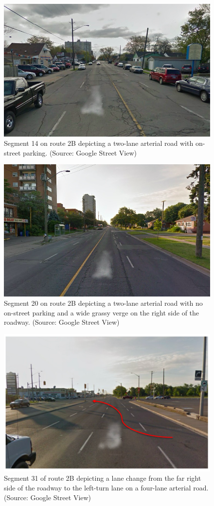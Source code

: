 \documentclass[]{elsarticle} %
\begin{document}
\begin{figure}

{\centering \includegraphics[width=0.65\linewidth]{Figure 19} 

}

\caption{Segment 14 on route 2B depicting a two-lane arterial road with on-street parking. (Source: Google Street View)}\label{fig:figure-20}
\end{figure}
\begin{figure}

{\centering \includegraphics[width=0.65\linewidth]{Figure 20} 

}

\caption{Segment 20 on route 2B depicting a two-lane arterial road with no on-street parking and a wide grassy verge on the right side of the roadway. (Source: Google Street View)}\label{fig:figure-21}
\end{figure}

\begin{figure}

{\centering \includegraphics[width=0.65\linewidth]{Figure 21} 

}

\caption{Segment 31 of route 2B depicting a lane change from the far right side of the roadway to the left-turn lane on a four-lane arterial road. (Source: Google Street View)}\label{fig:figure-22}
\end{figure}
\end{document}
